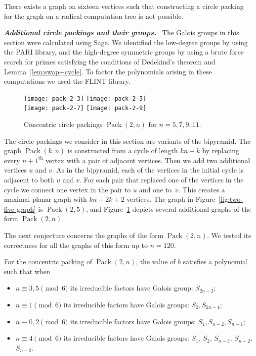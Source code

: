 \documentclass[oribibl,10pt]{llncs}
\newcommand{\Emph}[1]{\smallskip\textbf{\textit{#1}}~}
\DeclareMathOperator{\Pack}{Pack}
\newcommand{\nth}[1]{$#1^\text{th}$}
\begin{document}
\begin{appendix}
\begin{theorem}
There exists a graph on sixteen vertices such that constructing a circle packing for the graph on a radical computation tree is not possible.
\end{theorem}

\Emph{Additional circle packings and their groups.}\label{app:gallery}
The Galois groups in this section were calculated using Sage. We identified the low-degree groups by using the PARI library, and the high-degree symmetric groups by using a brute force search for primes satisfying the conditions of Dedekind's theorem and Lemma~\ref{lem:swap+cycle}. To factor the polynomials arising in these computations we used the FLINT library.

\begin{figure}[t]
\centering
\texttt{[image: pack-2-3]}\hspace{1em}
\texttt{[image: pack-2-5]}\\
\vspace{1em}
\texttt{[image: pack-2-7]}\hspace{1em}
\texttt{[image: pack-2-9]}
\caption{Concentric circle packings $\Pack(2,n)$ for $n = 5,7,9,11$.}
\label{fig:pack2n}
\end{figure}

The circle packings we consider in this section are variants of the bipyramid. The graph $\Pack(k,n)$ is constructed from a cycle of length $kn + k$ by replacing every \nth{n+1} vertex with a pair of adjacent vertices. Then we add two additional vertices $u$ and $v$. As in the bipyramid, each of the vertices in the initial cycle is adjacent to both $u$ and $v$. For each pair that replaced one of the vertices in the cycle we connect one vertex in the pair to $u$ and one to~$v$. This creates a maximal planar graph with $kn+2k + 2$ vertices. The graph in Figure~\ref{fig:two-five-graph} is $\Pack(2,5)$, and Figure~\ref{fig:pack2n} depicts several additional graphs of the form $\Pack(2,n)$.

The next conjecture concerns the graphs of the form $\Pack(2,n)$. We tested its correctness for all the graphs of this form up to $n = 120$.
\begin{conjecture}
For the concentric packing of $\Pack(2,n)$, the value of $b$ satisfies a polynomial such that when
\begin{itemize}
\item $n \equiv 3,5 \pmod{6}$ its irreducible factors have Galois group: $S_{2n-2}$;
\item $n \equiv 1 \pmod{6}$ its irreducible factors have Galois groups: $S_2, S_{2n-4}$;
\item $n \equiv 0,2 \pmod{6}$ its irreducible factors have Galois groups: $S_1,S_{n-2}, S_{n-1}$;
\item $n \equiv 4 \pmod{6}$ its irreducible factors have Galois groups: $S_1$, $S_2$, $S_{n-3}$, $S_{n-2}$, $S_{n-2}$.
\end{itemize}
\end{conjecture}


\end{appendix}
\end{document}
